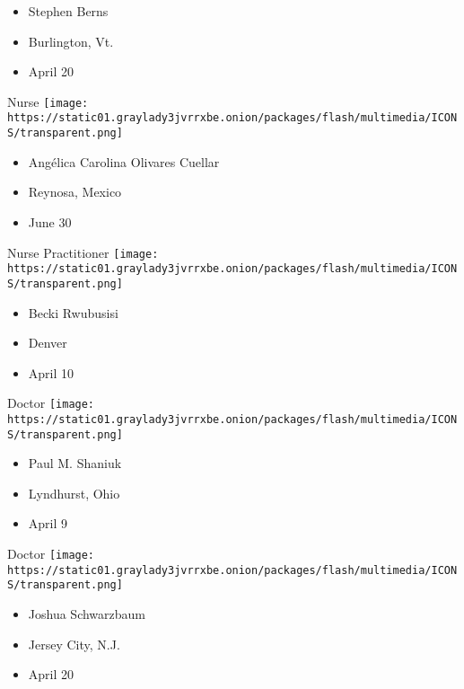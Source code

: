 \begin{itemize}
\tightlist
\item
  Stephen Berns
\item
  Burlington, Vt.
\item
  April 20
\end{itemize}

\protect\hyperlink{item-angelica-carolina-olivares-cuellar}{}

Nurse
\texttt{[image: https://static01.graylady3jvrrxbe.onion/packages/flash/multimedia/ICONS/transparent.png]}

\begin{itemize}
\tightlist
\item
  Angélica Carolina Olivares Cuellar
\item
  Reynosa, Mexico
\item
  June 30
\end{itemize}

\protect\hyperlink{item-becki-rwubusisi}{}

Nurse Practitioner
\texttt{[image: https://static01.graylady3jvrrxbe.onion/packages/flash/multimedia/ICONS/transparent.png]}

\begin{itemize}
\tightlist
\item
  Becki Rwubusisi
\item
  Denver
\item
  April 10
\end{itemize}

\protect\hyperlink{item-paul-m-shaniuk}{}

Doctor
\texttt{[image: https://static01.graylady3jvrrxbe.onion/packages/flash/multimedia/ICONS/transparent.png]}

\begin{itemize}
\tightlist
\item
  Paul M. Shaniuk
\item
  Lyndhurst, Ohio
\item
  April 9
\end{itemize}

\protect\hyperlink{item-joshua-schwarzbaum}{}

Doctor
\texttt{[image: https://static01.graylady3jvrrxbe.onion/packages/flash/multimedia/ICONS/transparent.png]}

\begin{itemize}
\tightlist
\item
  Joshua Schwarzbaum
\item
  Jersey City, N.J.
\item
  April 20
\end{itemize}

